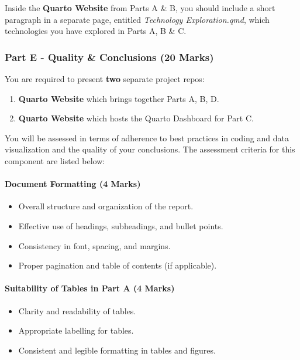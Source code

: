 \documentclass[
  letterpaper,
  DIV=11,
  numbers=noendperiod]{scrartcl}
\let\oldparagraph\paragraph
\renewcommand{\paragraph}[1]{\oldparagraph{#1}\mbox{}}
\providecommand{\tightlist}{%
  \setlength{\itemsep}{0pt}\setlength{\parskip}{0pt}}\usepackage{longtable,booktabs,array}
\begin{document}
Inside the \textbf{Quarto Website} from Parts A \& B, you should include
a short paragraph in a separate page, entitled \emph{Technology
Exploration.qmd}, which technologies you have explored in Parts A, B \&
C.

\subsubsection{Part E - Quality \& Conclusions (20
Marks)}\label{part-e---quality-conclusions-20-marks}

You are required to present \textbf{two} separate project repos:

\begin{enumerate}
\def\labelenumi{\arabic{enumi}.}
\tightlist
\item
  \textbf{Quarto Website} which brings together Parts A, B, D.
\item
  \textbf{Quarto Website} which hosts the Quarto Dashboard for Part C.
\end{enumerate}

You will be assessed in terms of adherence to best practices in coding
and data visualization and the quality of your conclusions. The
assessment criteria for this component are listed below:

\paragraph{Document Formatting (4
Marks)}\label{document-formatting-4-marks}

\begin{itemize}
\tightlist
\item
  Overall structure and organization of the report.
\item
  Effective use of headings, subheadings, and bullet points.
\item
  Consistency in font, spacing, and margins.
\item
  Proper pagination and table of contents (if applicable).
\end{itemize}

\paragraph{Suitability of Tables in Part A (4
Marks)}\label{suitability-of-tables-in-part-a-4-marks}

\begin{itemize}
\tightlist
\item
  Clarity and readability of tables.
\item
  Appropriate labelling for tables.
\item
  Consistent and legible formatting in tables and figures.
\end{itemize}
\end{document}
